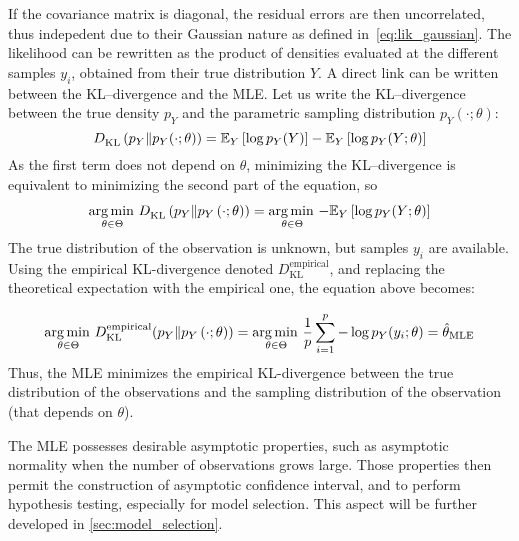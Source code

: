 \documentclass[../../Main_ManuscritThese.tex]{subfiles}
\begin{document}
  If the covariance matrix is diagonal, the residual errors are then uncorrelated, thus indepedent due to their Gaussian nature as defined in~\cref{eq:lik_gaussian}. The likelihood can be rewritten as the product of densities evaluated at the different samples $y_i$, obtained from their true distribution $Y$.
  A direct link can be written between the KL--divergence and the MLE. Let us write the KL--divergence between the true density $p_Y$ and the parametric sampling distribution $p_Y(\cdot;\theta)$:
  \begin{equation}
  D^{\mathrm{}}_{\mathrm{KL}}\left(p_Y \| p_Y(\cdot;\theta)\right) = \mathbb{E}_Y\left[\log p_Y(Y)\right]-\mathbb{E}_Y\left[\log p_Y(Y;\theta)\right]  
\end{equation}
As the first term does not depend on $\theta$, minimizing the KL--divergence is equivalent to minimizing the second part of the equation, so
\begin{align}
 \operatorname*{arg\,min \,}_{\theta \in\Theta} D^{\mathrm{}}_{\mathrm{KL}}\left(p_Y \| p_Y\left(\cdot;\theta \right)\right) = \operatorname*{arg\,min \,}_{\theta \in \Theta} -\mathbb{E}_{Y}\left[\log p_{Y}(Y ; \theta)\right]
\end{align}
The true distribution of the observation is unknown, but samples $y_i$ are available. Using the empirical KL-divergence denoted $D^{\mathrm{empirical}}_{\mathrm{KL}}$,  and replacing the theoretical expectation with the empirical one, the equation above becomes:

\begin{equation}
  \operatorname*{arg\,min \,}_{\theta \in\Theta} D^{\mathrm{empirical}}_{\mathrm{KL}}(p_Y \| p_Y\left(\cdot;\theta \right)) = \operatorname*{arg\,min \,}_{\theta \in\Theta} \frac{1}{p} \sum_{i=1}^p - \log p_Y(y_i;\theta) = \hat{\theta}_{\mathrm{MLE}}
\end{equation}
Thus, the MLE minimizes the empirical KL-divergence between the true distribution of the observations and the sampling distribution of the observation (that depends on $\theta$).

The MLE possesses desirable asymptotic properties, such as asymptotic normality when the number of observations grows large. Those properties then permit the construction of asymptotic confidence interval, and to perform hypothesis testing, especially for model selection. This aspect will be further developed in \cref{sec:model_selection}.
\end{document}
